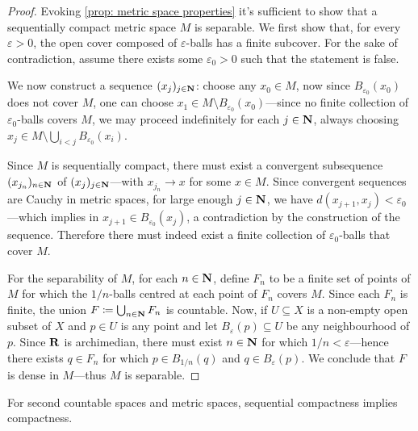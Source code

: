 \begin{proof}
    Evoking \cref{prop: metric space properties} it's sufficient to show that a
    sequentially compact metric space \(M\) is separable. We first show that, for
    every \(\varepsilon > 0\), the open cover composed of \(\varepsilon\)-balls has
    a finite subcover. For the sake of contradiction, assume there exists some
    \(\varepsilon_0 > 0\) such that the statement is false.

    We now construct a sequence \((x_j)_{j \in \mathbf{N}}\): choose any \(x_0 \in M\), now
    since \(B_{\varepsilon_0}(x_0)\) does not cover \(M\), one can choose
    \(x_1 \in M \setminus B_{\varepsilon_0}(x_0)\)---since no finite collection of
    \(\varepsilon_0\)-balls covers \(M\), we may proceed indefinitely for each
    \(j \in \mathbf{N}\), always choosing
    \(x_j \in M \setminus \bigcup_{i < j} B_{\varepsilon_0}(x_i)\).

    Since \(M\) is sequentially compact, there must exist a convergent subsequence
    \((x_{j_n})_{n \in \mathbf{N}}\) of \((x_j)_{j \in \mathbf{N}}\)---with \(x_{j_n} \to x\) for
    some \(x \in M\). Since convergent sequences are Cauchy in metric spaces, for
    large enough \(j \in \mathbf{N}\), we have \(d(x_{j+1}, x_j) < \varepsilon_0\)---which
    implies in \(x_{j+1} \in B_{\varepsilon_0}(x_j)\), a contradiction by the
    construction of the sequence. Therefore there must indeed exist a finite
    collection of \(\varepsilon_0\)-balls that cover \(M\).

    For the separability of \(M\), for each \(n \in \mathbf{N}\), define \(F_n\) to be a
    finite set of points of \(M\) for which the \(1/n\)-balls centred at each point
    of \(F_n\) covers \(M\). Since each \(F_n\) is finite, the union
    \(F \coloneq \bigcup_{n \in \mathbf{N}} F_n\) is countable. Now, if \(U \subseteq X\) is
    a non-empty open subset of \(X\) and \(p \in U\) is any point and let
    \(B_{\varepsilon}(p) \subseteq U\) be any neighbourhood of \(p\). Since \(\mathbf{R}\)
    is archimedian, there must exist \(n \in \mathbf{N}\) for which
    \(1/n < \varepsilon\)---hence there exists \(q \in F_n\) for which
    \(p \in B_{1/n}(q)\) and \(q \in B_{\varepsilon}(p)\). We conclude that \(F\) is
    dense in \(M\)---thus \(M\) is separable.
\end{proof}

\begin{proposition}
    \label{prop:metric-2nd-ctbl-seq-comp-implies-comp}
    For second countable spaces and metric spaces, sequential compactness implies
    compactness.
\end{proposition}

